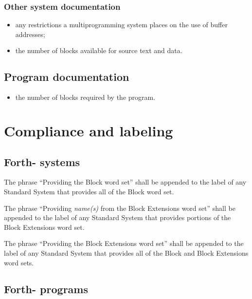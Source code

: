 \subsubsection{Other system documentation} %

\begin{itemize}
\item any restrictions a multiprogramming system places on the use
	of buffer addresses;
\item the number of blocks available for source text and data.
\end{itemize}

\subsection{Program documentation} %

\begin{itemize}
\item the number of blocks required by the program.
\end{itemize}


\section{Compliance and labeling} %

\cbstart{}
\subsection[Forth-\snapshot systems]{Forth-\snapshot{} systems} %
\cbend

The phrase ``Providing the Block word set'' shall be appended to
the label of any Standard System that provides all of the Block
word set.

The phrase ``Providing \emph{name(s)} from the Block Extensions
word set'' shall be appended to the label of any Standard System
that provides portions of the Block Extensions word set.

The phrase ``Providing the Block Extensions word set'' shall be
appended to the label of any Standard System that provides all of
the Block and Block Extensions word sets.

\cbstart{}
\subsection[Forth-\snapshot programs]{Forth-\snapshot{} programs} %
\cbend

